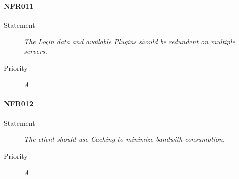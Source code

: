 \paragraph{NFR011}
\begin{description}
  \item [Statement] \textit{The Login data and available \gls{Plugins} should be redundant on multiple servers.}
  \item [Priority] \textit{A}
\end{description}

\paragraph{NFR012}
\begin{description}
  \item [Statement] \textit{The client should use \gls{Caching} to minimize bandwith consumption.}
  \item [Priority] \textit{A}
\end{description}

